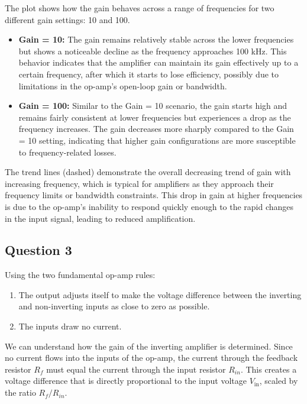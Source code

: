 \documentclass{article}
\begin{document}
The plot shows how the gain behaves across a range of frequencies for two different gain 
settings: 10 and 100.

\begin{itemize}
    \item \textbf{Gain = 10:} The gain remains relatively stable across 
    the lower frequencies but shows a noticeable decline as the frequency 
    approaches 100 kHz. This behavior indicates that the amplifier can maintain 
    its gain effectively up to a certain frequency, after which it starts to 
    lose efficiency, possibly due to limitations in the op-amp's open-loop gain or bandwidth.
    \item \textbf{Gain = 100:} Similar to the Gain = 10 scenario, the gain starts high and 
    remains fairly consistent at lower frequencies but experiences a drop as the frequency 
    increases. The gain decreases more sharply compared to the Gain = 10 setting, indicating 
    that higher gain configurations are more susceptible to frequency-related losses.
\end{itemize}

The trend lines (dashed) demonstrate the overall decreasing trend of gain 
with increasing frequency, which is typical for amplifiers as they approach 
their frequency limits or bandwidth constraints. This drop in gain at higher 
frequencies is due to the op-amp's inability to respond quickly enough to 
the rapid changes in the input signal, leading to reduced amplification.

\subsection*{Question 3}
Using the two fundamental op-amp rules:

\begin{enumerate}
    \item The output adjusts itself to make the voltage difference between the inverting and non-inverting inputs as close to zero as possible.
    \item The inputs draw no current.
\end{enumerate}

We can understand how the gain of the inverting amplifier is determined. Since 
no current flows into the inputs of the op-amp, the current through the feedback 
resistor \( R_f \) must equal the current through the input resistor \( R_{in} \). 
This creates a voltage difference that is directly proportional to the input 
voltage \( V_{\text{in}} \), scaled by the ratio \( R_f/R_{in} \).
\end{document}
